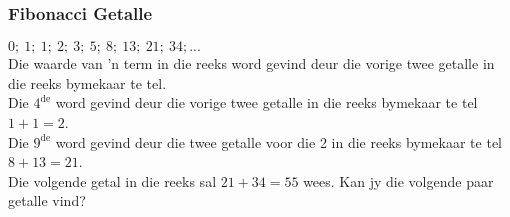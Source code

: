\subsubsection*{Fibonacci Getalle}
$0;~1;~1;~2;~3;~5;~8;~13;~21;~34;...$\\
Die waarde van ’n term in die reeks word gevind deur die vorige twee getalle in die reeks bymekaar te tel.\\
Die $4^{\mathrm{de}}$ word gevind deur die vorige twee getalle in die reeks bymekaar te tel $1+1=2$.\\
Die $9^{\mathrm{de}}$  word gevind deur die twee
getalle voor die 2 in die reeks bymekaar te tel $8+13=21$.\\
Die volgende getal in die reeks sal $21+34=55$ wees.
Kan jy die volgende paar getalle vind?


